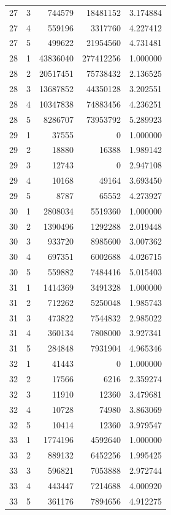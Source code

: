 \begin{longtable}{rrrrr}
27 & 3 & 744579 & 18481152 & 3.174884 \\
27 & 4 & 559196 & 3317760 & 4.227412 \\
27 & 5 & 499622 & 21954560 & 4.731481 \\
28 & 1 & 43836040 & 277412256 & 1.000000 \\
28 & 2 & 20517451 & 75738432 & 2.136525 \\
28 & 3 & 13687852 & 44350128 & 3.202551 \\
28 & 4 & 10347838 & 74883456 & 4.236251 \\
28 & 5 & 8286707 & 73953792 & 5.289923 \\
29 & 1 & 37555 & 0 & 1.000000 \\
29 & 2 & 18880 & 16388 & 1.989142 \\
29 & 3 & 12743 & 0 & 2.947108 \\
29 & 4 & 10168 & 49164 & 3.693450 \\
29 & 5 & 8787 & 65552 & 4.273927 \\
30 & 1 & 2808034 & 5519360 & 1.000000 \\
30 & 2 & 1390496 & 1292288 & 2.019448 \\
30 & 3 & 933720 & 8985600 & 3.007362 \\
30 & 4 & 697351 & 6002688 & 4.026715 \\
30 & 5 & 559882 & 7484416 & 5.015403 \\
31 & 1 & 1414369 & 3491328 & 1.000000 \\
31 & 2 & 712262 & 5250048 & 1.985743 \\
31 & 3 & 473822 & 7544832 & 2.985022 \\
31 & 4 & 360134 & 7808000 & 3.927341 \\
31 & 5 & 284848 & 7931904 & 4.965346 \\
32 & 1 & 41443 & 0 & 1.000000 \\
32 & 2 & 17566 & 6216 & 2.359274 \\
32 & 3 & 11910 & 12360 & 3.479681 \\
32 & 4 & 10728 & 74980 & 3.863069 \\
32 & 5 & 10414 & 12360 & 3.979547 \\
33 & 1 & 1774196 & 4592640 & 1.000000 \\
33 & 2 & 889132 & 6452256 & 1.995425 \\
33 & 3 & 596821 & 7053888 & 2.972744 \\
33 & 4 & 443447 & 7214688 & 4.000920 \\
33 & 5 & 361176 & 7894656 & 4.912275 \\

\end{longtable}
